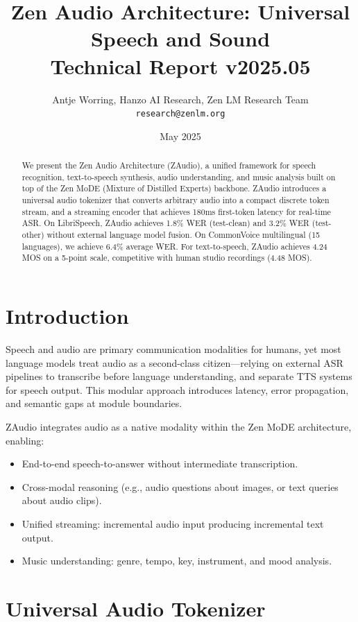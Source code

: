 \documentclass[11pt,a4paper]{article}
\title{\textbf{Zen Audio Architecture: Universal Speech and Sound}\\
\large Technical Report v2025.05}
\author{Antje Worring, Hanzo AI Research, Zen LM Research Team\\
\texttt{research@zenlm.org}}
\date{May 2025}
\begin{document}
\maketitle

\begin{abstract}
We present the Zen Audio Architecture (ZAudio), a unified framework for speech recognition, text-to-speech synthesis, audio understanding, and music analysis built on top of the Zen MoDE (Mixture of Distilled Experts) backbone. ZAudio introduces a universal audio tokenizer that converts arbitrary audio into a compact discrete token stream, and a streaming encoder that achieves 180ms first-token latency for real-time ASR. On LibriSpeech, ZAudio achieves 1.8\% WER (test-clean) and 3.2\% WER (test-other) without external language model fusion. On CommonVoice multilingual (15 languages), we achieve 6.4\% average WER. For text-to-speech, ZAudio achieves 4.24 MOS on a 5-point scale, competitive with human studio recordings (4.48 MOS).
\end{abstract}

\section{Introduction}

Speech and audio are primary communication modalities for humans, yet most language models treat audio as a second-class citizen—relying on external ASR pipelines to transcribe before language understanding, and separate TTS systems for speech output. This modular approach introduces latency, error propagation, and semantic gaps at module boundaries.

ZAudio integrates audio as a native modality within the Zen MoDE architecture, enabling:
\begin{itemize}
  \item End-to-end speech-to-answer without intermediate transcription.
  \item Cross-modal reasoning (e.g., audio questions about images, or text queries about audio clips).
  \item Unified streaming: incremental audio input producing incremental text output.
  \item Music understanding: genre, tempo, key, instrument, and mood analysis.
\end{itemize}

\section{Universal Audio Tokenizer}
\end{document}
